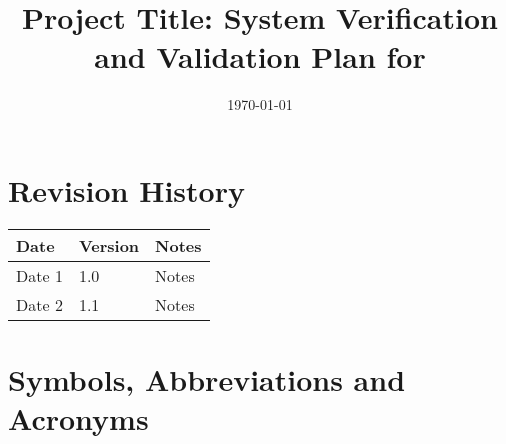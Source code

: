 \documentclass[12pt, titlepage]{article}
\begin{document}
\title{Project Title: System Verification and Validation Plan for \progname{}} 
\author{\authname}
\date{\today}
	
\maketitle


\section{Revision History}

\begin{tabularx}{\textwidth}{p{3cm}p{2cm}X}
\toprule {\bf Date} & {\bf Version} & {\bf Notes}\\
\midrule
Date 1 & 1.0 & Notes\\
Date 2 & 1.1 & Notes\\
\bottomrule
\end{tabularx}

\newpage

\tableofcontents

\listoftables

\listoffigures
{}

\newpage

\section{Symbols, Abbreviations and Acronyms}
\end{document}
